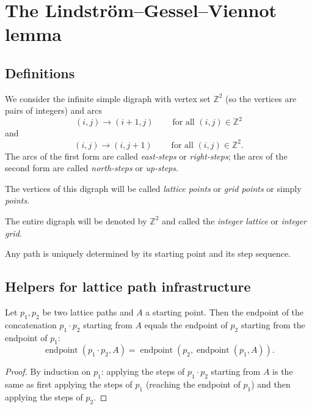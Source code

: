 \section{The Lindstr\"{o}m--Gessel--Viennot lemma}

\subsection{Definitions}

\begin{definition}
\label{def.lgv.lattice}
\leantarget
\leanok
We consider the infinite simple digraph with vertex set $\mathbb{Z}^{2}$
(so the vertices are pairs of integers) and arcs
\[
  \left(  i,j\right)  \rightarrow\left(  i+1,j\right)
  \ \ \ \ \ \ \ \ \ \ \text{for all }\left(  i,j\right)  \in\mathbb{Z}^{2}
\]
and
\[
  \left(  i,j\right)  \rightarrow\left(  i,j+1\right)
  \ \ \ \ \ \ \ \ \ \ \text{for all }\left(  i,j\right)  \in\mathbb{Z}^{2}.
\]
The arcs of the first form are called \emph{east-steps} or \emph{right-steps};
the arcs of the second form are called \emph{north-steps} or \emph{up-steps}.

The vertices of this digraph will be called \emph{lattice points} or
\emph{grid points} or simply \emph{points}.

The entire digraph will be denoted by $\mathbb{Z}^{2}$ and called the
\emph{integer lattice} or \emph{integer grid}.

Any path is uniquely determined by its starting point and its step sequence.
\end{definition}

\subsection{Helpers for lattice path infrastructure}

\begin{lemma}
\label{lem.lgv.endpoint-append}
\leanhelper
\leanok
Let $p_1, p_2$ be two lattice paths and $A$ a starting point. Then the endpoint of
the concatenation $p_1 \cdot p_2$ starting from $A$ equals the endpoint of $p_2$
starting from the endpoint of $p_1$:
\[
  \operatorname{endpoint}(p_1 \cdot p_2, A) = \operatorname{endpoint}(p_2, \operatorname{endpoint}(p_1, A)).
\]
\end{lemma}

\begin{proof}
By induction on $p_1$: applying the steps of $p_1 \cdot p_2$ starting from $A$
is the same as first applying the steps of $p_1$ (reaching the endpoint of $p_1$)
and then applying the steps of $p_2$.
\end{proof}

